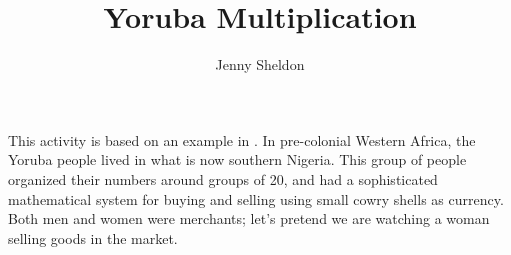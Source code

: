 \documentclass[nooutcomes, noauthor, handout]{ximera}
\title{Yoruba Multiplication}
\author{Jenny Sheldon}
\begin{document}
\begin{abstract}

 \end{abstract}
\maketitle

This activity is based on an example in . In pre-colonial Western Africa, the Yoruba people lived in what is now southern Nigeria. This group of people organized their numbers around groups of 20, and had a sophisticated mathematical system for buying and selling using small cowry shells as currency. Both men and women were merchants; let's pretend we are watching a woman selling goods in the market.
\end{document}
